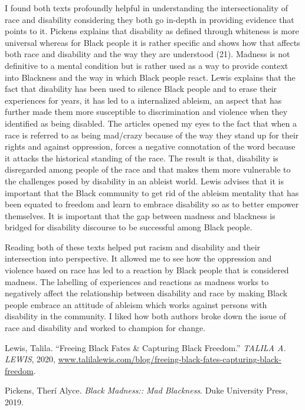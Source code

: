 \documentclass[11pt]{article}
\begin{document}
I found both texts profoundly helpful in understanding the intersectionality of race and disability considering they both go in-depth in providing evidence that points to it. Pickens explains that disability as defined through whiteness is more universal whereas for Black people it is rather specific and shows how that affects both race and disability and the way they are understood (21). Madness is not definitive to a mental condition but is rather used as a way to provide context into Blackness and the way in which Black people react. Lewis explains that the fact that disability has been used to silence Black people and to erase their experiences for years, it has led to a internalized ableism, an aspect that has further made them more susceptible to discrimination and violence when they identified as being disabled. The articles opened my eyes to the fact that when a race is referred to as being mad/crazy because of the way they stand up for their rights and against oppression, forces a negative connotation of the word because it attacks the historical standing of the race. The result is that, disability is disregarded among people of the race and that makes them more vulnerable to the challenges posed by disability in an ableist world. Lewis advises that it is important that the Black community to get rid of the ableism mentality that has been equated to freedom and learn to embrace disability so as to better empower themselves. It is important that the gap between madness and blackness is bridged for disability discourse to be successful among Black people.

Reading both of these texts helped put racism and disability and their intersection into perspective. It allowed me to see how the oppression and violence based on race has led to a reaction by Black people that is considered madness. The labelling of experiences and reactions as madness works to negatively affect the relationship between disability and race by making Black people embrace an attitude of ableism which works against persons with disability in the community. I liked how both authors broke down the issue of race and disability and worked to champion for change.

\begin{references}
\item Lewis, Talila. “Freeing Black Fates \& Capturing Black Freedom.” \textit{TALILA A. LEWIS}, 2020, \url{www.talilalewis.com/blog/freeing-black-fates-capturing-black-freedom}.
\item Pickens, Therí Alyce. \textit{Black Madness:: Mad Blackness}. Duke University Press, 2019.
\end{references}
\end{document}
